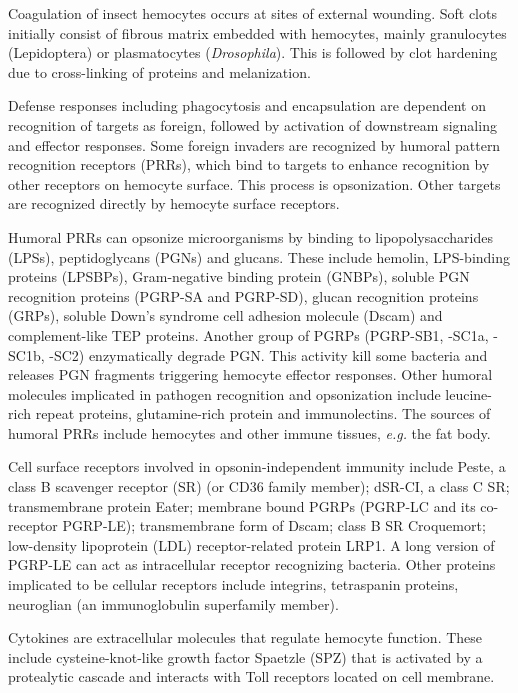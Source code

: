 \documentclass[11pt]{article}
\begin{document}
\begin{sloppypar}
\par
Coagulation of insect hemocytes occurs at sites of external wounding. 
Soft clots initially consist of fibrous matrix embedded with hemocytes, mainly granulocytes (Lepidoptera) or plasmatocytes (\textit{Drosophila}). 
This is followed by clot hardening due to cross-linking of proteins and melanization.
\par
Defense responses including phagocytosis and encapsulation are dependent on recognition of targets as foreign, followed by activation of downstream signaling and effector responses. 
Some foreign invaders are recognized by humoral pattern recognition receptors (PRRs), which bind to targets to enhance recognition by other receptors on hemocyte surface. 
This process is opsonization. 
Other targets are recognized directly by hemocyte surface receptors.
\par
Humoral PRRs can opsonize microorganisms by binding to lipopolysaccharides (LPSs), peptidoglycans (PGNs) and glucans. 
These include 
hemolin, 
LPS-binding proteins (LPSBPs), 
Gram-negative binding protein (GNBPs), 
soluble PGN recognition proteins (PGRP-SA and PGRP-SD), 
glucan recognition proteins (GRPs), 
soluble Down's syndrome cell adhesion molecule (Dscam) 
and complement-like TEP proteins. 
Another group of PGRPs (PGRP-SB1, -SC1a, -SC1b, -SC2) enzymatically degrade PGN. 
This activity kill some bacteria and releases PGN fragments triggering hemocyte effector responses. 
Other humoral molecules implicated in pathogen recognition and opsonization include 
leucine-rich repeat proteins, 
glutamine-rich protein 
and immunolectins. 
The sources of humoral PRRs include hemocytes and other immune tissues, \textit{e.g.} the fat body. 
\par
Cell surface receptors involved in opsonin-independent immunity include 
Peste, a class B scavenger receptor (SR) (or CD36 family member); 
dSR-CI, a class C SR; 
transmembrane protein Eater; 
membrane bound PGRPs (PGRP-LC and its co-receptor PGRP-LE); 
transmembrane form of Dscam; 
class B SR Croquemort; 
low-density lipoprotein (LDL) receptor-related protein LRP1. 
A long version of PGRP-LE can act as intracellular receptor recognizing bacteria. 
Other proteins implicated to be cellular receptors include 
integrins, 
tetraspanin proteins, 
neuroglian (an immunoglobulin superfamily member).
\par
Cytokines are extracellular molecules that regulate hemocyte function. 
These include cysteine-knot-like growth factor Spaetzle (SPZ) that is activated by a protealytic cascade and interacts with Toll receptors located on cell membrane. 

\end{sloppypar}
\end{document}
